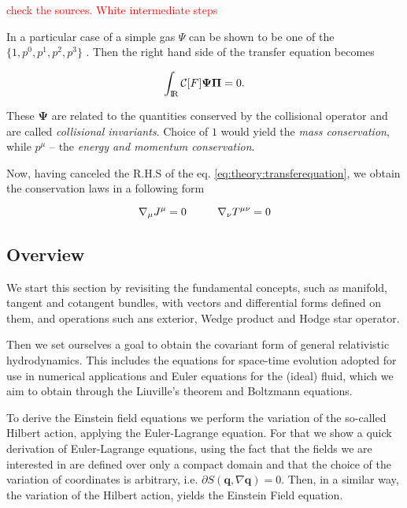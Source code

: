 \textcolor{red}{check the sources. White intermediate steps}

In a particular case of a simple gas $\Psi$ can be shown to be one of the $\{1,p^0,p^1,p^2,p^3\}$ \cite{Cercignani:2002}. 
Then the right hand side of the transfer equation becomes 

\begin{equation}
\int_{\text{I\!R}} \mathcal{C}[F]\boldsymbol{\Psi}\boldsymbol{\Pi} = 0.
\end{equation}

These $\boldsymbol{\Psi}$ are related to the quantities conserved by the collisional operator and are called \textit{collisional invariants}. 
Choice of $1$ would yield the \textit{mass conservation}, 
while $p^{\mu}$ -- the \textit{energy and momentum conservation}.

Now, having canceled the R.H.S of the eq. \ref{eq:theory:transferequation}, we obtain the conservation laws in a following form

\begin{equation}
\nabla_{\mu}J^{\mu} =0 \hspace{10mm}\nabla_{\nu}T^{\mu\nu} =0
\end{equation}


\subsection{Overview}

We start this section by revisiting the fundamental concepts, such as manifold, tangent and cotangent bundles, with vectors and differential forms defined on them, and operations such ans exterior, Wedge product and Hodge star operator. 

Then we set ourselves a goal to obtain the covariant form of general relativistic hydrodynamics. 
This includes the equations for space-time evolution adopted for use in numerical applications and Euler equations for the (ideal) fluid, which we aim to obtain through the Liuville's theorem and Boltzmann equations.

To derive the Einstein field equations we perform the variation of the so-called Hilbert action, applying the Euler-Lagrange equation. For that we show a quick derivation of Euler-Lagrange equations, using the fact that the fields we are interested in are defined over only a compact domain and that the choice of the variation of coordinates is arbitrary, i.e. $\partial S(\boldsymbol{q}, \nabla \boldsymbol{q}) = 0$. 
Then, in a similar way, the variation of the Hilbert action, yields the Einstein Field equation.

